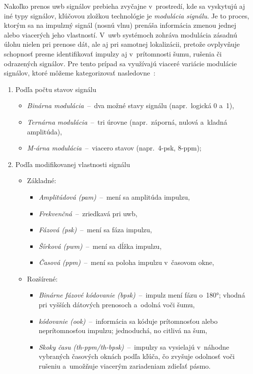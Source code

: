       Nakoľko prenos \acrshort{uwb} signálov prebieha zvyčajne v~prostredí, kde sa vyskytujú aj iné typy signálov, kľúčovou zložkou technológie je \emph{modulácia signálu}. Je to proces, ktorým sa na impulzný signál (nosnú vlnu) prenáša informácia zmenou jednej alebo viacerých jeho vlastností. V~\acrshort{uwb} systémoch zohráva modulácia zásadnú úlohu nielen pri prenose dát, ale aj pri samotnej lokalizácii, pretože ovplyvňuje schopnosť presne identifikovať impulzy aj v~prítomnosti šumu, rušenia či odrazených signálov. Pre tento prípad sa využívajú viaceré variácie modulácie signálov, ktoré môžeme kategorizovať nasledovne~\cite{alarifiUltraWidebandIndoor2016}:
      \begin{enumerate}
        \item Podľa počtu stavov signálu
        \begin{itemize}
          \item \emph{Binárna modulácia}~--~dva možné stavy signálu (napr.\ logická 0 a~1),
          \item \emph{Ternárna modulácia}~--~tri úrovne (napr.\ záporná, nulová a~kladná amplitúda),
          \item \emph{M-árna modulácia}~--~viacero stavov (napr.\ 4-\acrshort{psk}, 8-\acrshort{ppm});
        \end{itemize}
        \item Podľa modifikovanej vlastnosti signálu
        \begin{itemize}
          \item Základné:
          \begin{itemize}
            \item \emph{Amplitúdová (\acrshort{pam})}~--~mení sa amplitúda impulzu,
            \item \emph{Frekvenčná}~--~zriedkavá pri \acrshort{uwb},
            \item \emph{Fázová (\acrshort{psk})}~--~mení sa fáza impulzu,
            \item \emph{Šírková (\acrshort{pwm})}~--~mení sa dĺžka impulzu,
            \item \emph{Časová (\acrshort{ppm})}~--~mení sa poloha impulzu v~časovom okne,
          \end{itemize}
          \item Rozšírené:
          \begin{itemize}
            \item \emph{Binárne fázové kódovanie (\acrshort{bpsk})}~--~impulz mení fázu o~180°; vhodná pri vyšších dátových prenosoch a~odolná voči šumu,
            \item \emph{ kódovanie (\acrshort{ook})}~--~informácia sa kóduje prítomnosťou alebo neprítomnosťou impulzu; jednoduchá, no citlivá na šum,
            \item \emph{Skoky času (\acrshort{th}-\acrshort{ppm}/\acrshort{th}-\acrshort{bpsk})}~--~impulzy sa vysielajú v~náhodne vybraných časových oknách podľa kľúča, čo zvyšuje odolnosť voči rušeniu a~umožňuje viacerým zariadeniam zdieľať pásmo.
          \end{itemize}
        \end{itemize}
      \end{enumerate}
      
